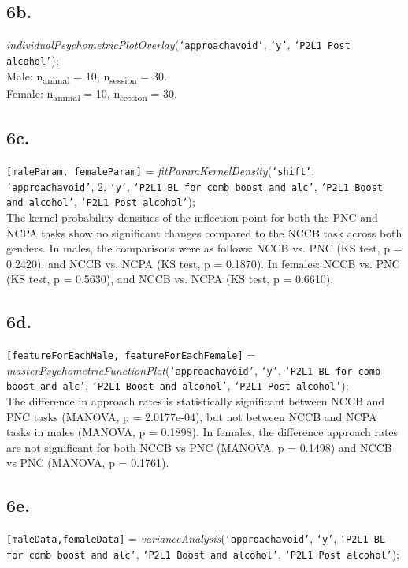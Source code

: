 \documentclass{article}
\begin{document}
\subsection{6b.}
\emph{individualPsychometricPlotOverlay}(\texttt{`approachavoid'}, \texttt{`y'}, \texttt{`P2L1 Post alcohol'});\\
Male: n\textsubscript{animal} = 10, n\textsubscript{session} = 30.\\
Female: n\textsubscript{animal} = 10, n\textsubscript{session} = 30.\\

\subsection{6c.}
\texttt{[maleParam, femaleParam]} = \emph{fitParamKernelDensity}(\texttt{`shift'}, \texttt{`approachavoid'}, 2, \texttt{`y'}, \texttt{`P2L1 BL for comb boost and alc'}, \texttt{`P2L1 Boost and alcohol'}, \texttt{`P2L1 Post alcohol'});\\

The kernel probability densities of the inflection point for both the PNC and NCPA tasks show no significant changes compared to the NCCB task across both genders. In males, the comparisons were as follows: NCCB vs. PNC (KS test, p = 0.2420), and NCCB vs. NCPA (KS test, p = 0.1870). In females: NCCB vs. PNC (KS test, p = 0.5630), and NCCB vs. NCPA (KS test, p = 0.6610).

\subsection{6d.}
\texttt{[featureForEachMale, featureForEachFemale]} = \emph{masterPsychometricFunctionPlot}(\texttt{`approachavoid'}, \texttt{`y'}, \texttt{`P2L1 BL for comb boost and alc'}, \texttt{`P2L1 Boost and alcohol'}, \texttt{`P2L1 Post alcohol'});\\

The difference in approach rates is statistically significant between NCCB and PNC tasks (MANOVA, p = 2.0177e-04), but not between NCCB and NCPA tasks in males (MANOVA, p = 0.1898). In females, the difference approach rates are not significant for both NCCB vs PNC (MANOVA, p = 0.1498) and NCCB vs PNC (MANOVA, p = 0.1761).

\subsection{6e.}
\texttt{[maleData,femaleData]} = \emph{varianceAnalysis}(\texttt{`approachavoid'}, \texttt{`y'}, \texttt{`P2L1 BL for comb boost and alc'}, \texttt{`P2L1 Boost and alcohol'}, \texttt{`P2L1 Post alcohol'});\\
\end{document}

